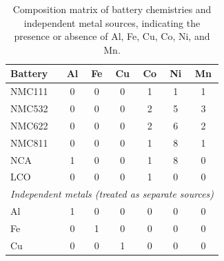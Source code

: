 \documentclass[final,2p,times]{elsarticle}
\begin{document}
\begin{table}[!h]
    \centering
    \caption{Composition matrix of battery chemistries and independent metal sources, indicating the presence or absence of Al, Fe, Cu, Co, Ni, and Mn.}\label{tab:battery_chem_types}
    \scriptsize
    \begin{tabular}{p{2.4cm} cccccc}
    \toprule
    \textbf{Battery} & \textbf{Al} & \textbf{Fe} & \textbf{Cu} & \textbf{Co} & \textbf{Ni} & \textbf{Mn} \\
    \midrule
    NMC111 & 0 & 0 & 0 & 1 & 1 & 1 \\
    NMC532 & 0 & 0 & 0 & 2 & 5 & 3 \\
    NMC622 & 0 & 0 & 0 & 2 & 6 & 2 \\
    NMC811 & 0 & 0 & 0 & 1 & 8 & 1 \\
    NCA    & 1 & 0 & 0 & 1 & 8 & 0 \\
    LCO    & 0 & 0 & 0 & 1 & 0 & 0 \\
    \midrule
    \multicolumn{7}{l}{\textit{Independent metals (treated as separate sources)}} \\
    Al     & 1 & 0 & 0 & 0 & 0 & 0 \\
    Fe     & 0 & 1 & 0 & 0 & 0 & 0 \\
    Cu     & 0 & 0 & 1 & 0 & 0 & 0 \\
    \bottomrule
    \end{tabular}
\end{table}

\end{document}
